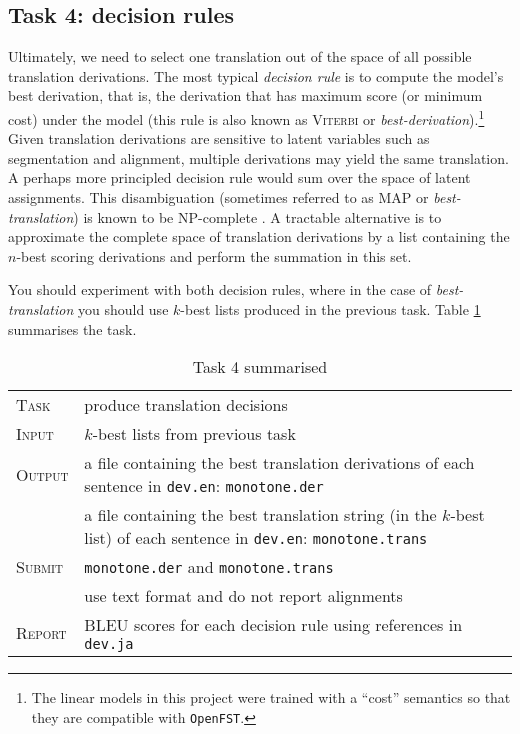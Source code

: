 \subsection{Task 4: decision rules}

Ultimately, we need to select one translation out of the space of all possible translation derivations.
The most typical \emph{decision rule} is to compute the model's best derivation, that is, the derivation that has maximum score (or minimum cost) under the model (this rule is also known as \textsc{Viterbi} or \emph{best-derivation}).\footnote{The linear models in this project were trained with a ``cost'' semantics so that they are compatible with \texttt{OpenFST}.}
Given translation derivations are sensitive to latent variables such as segmentation and alignment, multiple derivations may yield the same translation. 
A perhaps more principled decision rule would sum over the space of latent assignments.
This disambiguation (sometimes referred to as \textsc{MAP} or \emph{best-translation}) is known to be NP-complete \citep{Simaan:1996:complexity}.
A tractable alternative is to approximate the complete space of translation derivations by a list containing the $n$-best scoring derivations and perform the summation in this set.

You should experiment with both decision rules, where in the case of \emph{best-translation} you should use $k$-best lists produced in the previous task.
Table \ref{tab:task4} summarises the task. 

\begin{table}\centering
\begin{tabular}{l p{12cm}}
\textsc{Task}   &  produce translation decisions \\
\textsc{Input}  &  $k$-best lists from previous task \\
\textsc{Output} &  a file containing the best translation derivations of each sentence in \texttt{dev.en}: \texttt{monotone.der}\\
    			&  a file containing the best translation string (in the $k$-best list) of each sentence in \texttt{dev.en}: \texttt{monotone.trans}\\
\textsc{Submit} &  \texttt{monotone.der} and \texttt{monotone.trans}\\
                &  use text format and do not report alignments\\  
\textsc{Report} & BLEU scores for each decision rule using references in \texttt{dev.ja} \\             
\end{tabular}
\caption{\label{tab:task4}Task 4 summarised}
\end{table}

